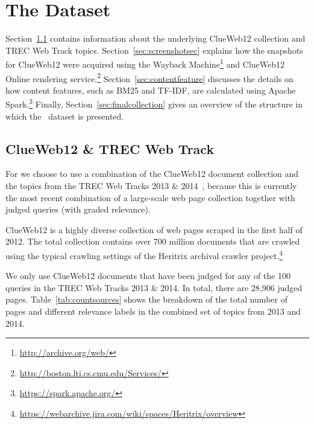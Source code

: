 
\section{The \protect\datasetname{} Data\-set}
\label{sec:dataset}
Section~\ref{sec:trecclue} contains information about the underlying ClueWeb12 collection and TREC Web Track topics. Section~\ref{sec:screenshotsec} explains how the snapshots for ClueWeb12 were acquired using the Wayback Machine\footnote{\url{http://archive.org/web/}} and ClueWeb12 Online rendering service.\footnote{\url{http://boston.lti.cs.cmu.edu/Services/}} Section~\ref{sec:contentfeature} discusses the details on how content features, such as BM25 and TF-IDF, are calculated using Apache Spark.\footnote{\url{https://spark.apache.org/}} Finally, Section~\ref{sec:finalcollection} gives an overview of the structure in which the \datasetname~dataset is presented.
\fi

\subsection{ClueWeb12 \& TREC Web Track}\label{sec:trecclue}
For \datasetname{} we choose to use a combination of the ClueWeb12 document collection and the topics from the TREC Web Tracks 2013 \& 2014~\cite{collins2013trec,collins2015trec},
because this is currently the most recent combination of a large-scale web page collection together with judged queries (with graded relevance). 

ClueWeb12 is a highly diverse collection of web pages scraped in the first half of 2012.
The total collection contains over 700 million documents that are crawled using the typical crawling settings of the Heritrix archival crawler project.\footnote{\url{https://webarchive.jira.com/wiki/spaces/Heritrix/overview}}

We only use ClueWeb12 documents that have been judged for any of the 100 queries in the TREC Web Tracks 2013 \& 2014. In total, there are 28,906 judged pages.
%
Table~\ref{tab:countsources} shows the breakdown of the total number of pages and different relevance labels in the combined set of topics from 2013 and 2014.


